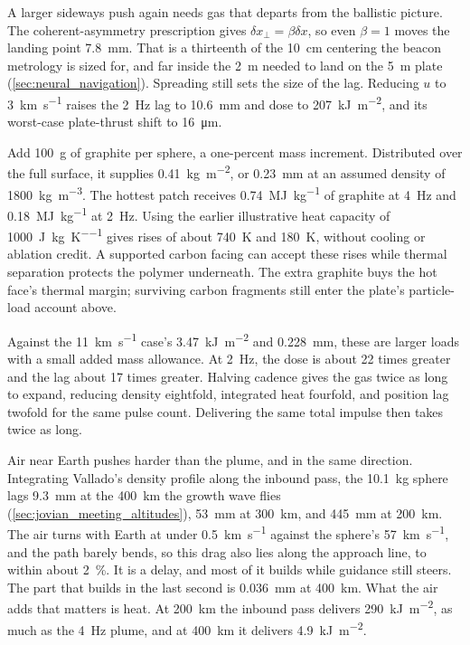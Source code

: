 \documentclass{article}
\begin{document}
A larger sideways push again needs gas that departs from the ballistic picture. The coherent-asymmetry prescription gives $\delta x_\perp=\beta\delta x$, so even $\beta=1$ moves the landing point \SI{7.8}{\milli\meter}. That is a thirteenth of the \SI{10}{\centi\meter} centering the beacon metrology is sized for, and far inside the \SI{2}{\meter} needed to land on the \SI{5}{\meter} plate (\autoref{sec:neural_navigation}). Spreading still sets the size of the lag. Reducing $u$ to \SI{3}{\kilo\meter\per\second} raises the \SI{2}{\hertz} lag to \SI{10.6}{\milli\meter} and dose to \SI{207}{\kilo\joule\per\square\meter}, and its worst-case plate-thrust shift to \SI{16}{\micro\meter}.

Add \SI{100}{\gram} of graphite per sphere, a one-percent mass increment. Distributed over the full surface, it supplies \SI{0.41}{\kilogram\per\square\meter}, or \SI{0.23}{\milli\meter} at an assumed density of \SI{1800}{\kilogram\per\cubic\meter}. The hottest patch receives \SI{0.74}{\mega\joule\per\kilogram} of graphite at \SI{4}{\hertz} and \SI{0.18}{\mega\joule\per\kilogram} at \SI{2}{\hertz}. Using the earlier illustrative heat capacity of \SI{1000}{\joule\per\kilogram\per\kelvin} gives rises of about \SI{740}{\kelvin} and \SI{180}{\kelvin}, without cooling or ablation credit. A supported carbon facing can accept these rises while thermal separation protects the polymer underneath. The extra graphite buys the hot face's thermal margin; surviving carbon fragments still enter the plate's particle-load account above.

Against the \SI{11}{\kilo\meter\per\second} case's \SI{3.47}{\kilo\joule\per\square\meter} and \SI{0.228}{\milli\meter}, these are larger loads with a small added mass allowance. At \SI{2}{\hertz}, the dose is about 22 times greater and the lag about 17 times greater. Halving cadence gives the gas twice as long to expand, reducing density eightfold, integrated heat fourfold, and position lag twofold for the same pulse count. Delivering the same total impulse then takes twice as long.

Air near Earth pushes harder than the plume, and in the same direction. Integrating Vallado's density profile \cite{vallado_atmosexp} along the inbound pass, the \SI{10.1}{\kilogram} sphere lags \SI{9.3}{\milli\meter} at the \SI{400}{\kilo\meter} the growth wave flies (\autoref{sec:jovian_meeting_altitudes}), \SI{53}{\milli\meter} at \SI{300}{\kilo\meter}, and \SI{445}{\milli\meter} at \SI{200}{\kilo\meter}. The air turns with Earth at under \SI{0.5}{\kilo\meter\per\second} against the sphere's \SI{57}{\kilo\meter\per\second}, and the path barely bends, so this drag also lies along the approach line, to within about \SI{2}{\percent}. It is a delay, and most of it builds while guidance still steers. The part that builds in the last second is \SI{0.036}{\milli\meter} at \SI{400}{\kilo\meter}. What the air adds that matters is heat. At \SI{200}{\kilo\meter} the inbound pass delivers \SI{290}{\kilo\joule\per\square\meter}, as much as the \SI{4}{\hertz} plume, and at \SI{400}{\kilo\meter} it delivers \SI{4.9}{\kilo\joule\per\square\meter}.
\end{document}
